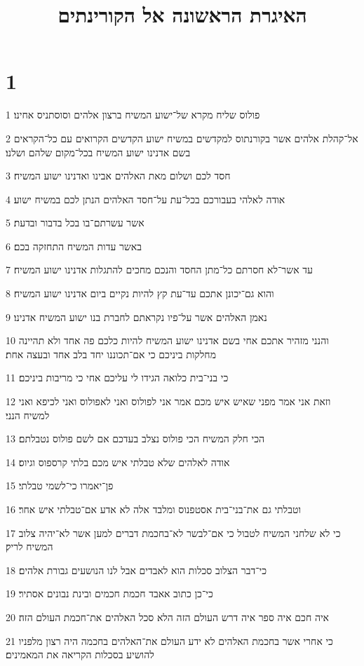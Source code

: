 

\title{האיגרת הראשונה אל הקורינתים}


\chapter{1}

\par 1 פולוס שליח מקרא של־ישוע המשיח ברצון אלהים וסוסתניס אחינו׃
\par 2 אל־קהלת אלהים אשר בקורנתוס למקדשים במשיח ישוע הקדשים הקרואים עם כל־הקראים בשם אדנינו ישוע המשיח בכל־מקום שלהם ושלנו׃
\par 3 חסד לכם ושלום מאת האלהים אבינו ואדנינו ישוע המשיח׃
\par 4 אודה לאלהי בעבורכם בכל־עת על־חסד האלהים הנתן לכם במשיח ישוע׃
\par 5 אשר עשרתם־בו בכל בדבור ובדעת׃
\par 6 באשר עדות המשיח התחזקה בכם׃
\par 7 עד אשר־לא חסרתם כל־מתן החסד והנכם מחכים להתגלות אדנינו ישוע המשיח׃
\par 8 והוא גם־יכונן אתכם עד־עת קץ להיות נקיים ביום אדנינו ישוע המשיח׃
\par 9 נאמן האלהים אשר על־פיו נקראתם לחברת בנו ישוע המשיח אדנינו׃
\par 10 והנני מזהיר אתכם אחי בשם אדנינו ישוע המשיח להיות כלכם פה אחד ולא תהיינה מחלקות ביניכם כי אם־תכוננו יחד בלב אחד ובעצה אחת׃
\par 11 כי בני־בית כלואה הגידו לי עליכם אחי כי מריבות ביניכם׃
\par 12 וזאת אני אמר מפני שאיש איש מכם אמר אני לפולוס ואני לאפולוס ואני לכיפא ואני למשיח הנני׃
\par 13 הכי חלק המשיח הכי פולוס נצלב בעדכם אם לשם פולוס נטבלתם׃
\par 14 אודה לאלהים שלא טבלתי איש מכם בלתי קרספוס וגיוס׃
\par 15 פן־יאמרו כי־לשמי טבלתי׃
\par 16 וטבלתי גם את־בני־בית אסטפנוס ומלבד אלה לא אדע אם־טבלתי איש אחר׃
\par 17 כי לא שלחני המשיח לטבול כי אם־לבשר לא־בחכמת דברים למען אשר לא־יהיה צלוב המשיח לריק׃
\par 18 כי־דבר הצלוב סכלות הוא לאבדים אבל לנו הנושעים גבורת אלהים׃
\par 19 כי־כן כתוב אאבד חכמת חכמים ובינת נבונים אסתיר׃
\par 20 איה חכם איה ספר איה דרש העולם הזה הלא סכל האלהים את־חכמת העולם הזה׃
\par 21 כי אחרי אשר בחכמת האלהים לא ידע העולם את־האלהים בחכמה היה רצון מלפניו להושיע בסכלות הקריאה את המאמינים׃

